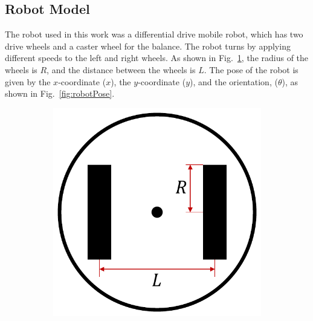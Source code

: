 \documentclass[conference]{IEEEtran}
\begin{document}
\subsection{Robot Model}\label{subsec:robotModel}
The robot used in this work was a differential drive mobile robot, which has
two drive wheels and a caster wheel for the balance. The robot turns by applying
different speeds to the left and right wheels. As shown in Fig.~\ref{fig:robotGeometry}, the radius of the wheels is $R$, and the distance
between the wheels is $L.$ The pose of the robot is given by the $x$-coordinate
($x$), the $y$-coordinate ($y$), and the orientation, ($\theta$), as shown in
Fig.~\ref{fig:robotPose}. %
%
\begin{figure}[htbp]
    \centering
    \begin{subfigure}{0.4\linewidth}
        \centering
        \includegraphics[width=\textwidth]{figs/robotGeometry.pdf}
        \caption{}
        \label{fig:robotGeometry}
    \end{subfigure}%
    \begin{subfigure}{0.4\linewidth}
        \centering

\end{subfigure}
\end{figure}
\end{document}
